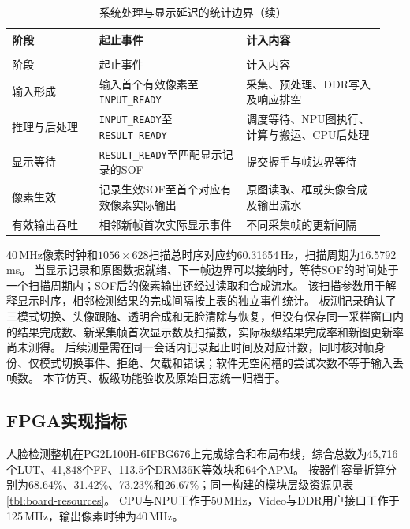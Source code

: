 \begin{reporttable}
\begin{longtable}{@{}p{0.22\linewidth}>{\raggedright\arraybackslash}p{0.37\linewidth}p{0.35\linewidth}@{}}
\caption{系统处理与显示延迟的统计边界}\label{tbl:system-latency-boundaries}\\
\toprule
阶段 & 起止事件 & 计入内容 \\
\midrule
\endfirsthead
\caption[]{系统处理与显示延迟的统计边界（续）}\\
\toprule
阶段 & 起止事件 & 计入内容 \\
\midrule
\endhead
\bottomrule
\endfoot
输入形成 & 输入首个有效像素至\texttt{INPUT\_READY} & 采集、预处理、DDR写入及响应排空 \\
推理与后处理 & \texttt{INPUT\_READY}至\texttt{RESULT\_READY} & 调度等待、NPU图执行、计算与搬运、CPU后处理 \\
显示等待 & \texttt{RESULT\_READY}至匹配显示记录的SOF & 提交握手与帧边界等待 \\
像素生效 & 记录生效SOF至首个对应有效像素实际输出 & 原图读取、框或头像合成及输出流水 \\
有效输出吞吐 & 相邻新帧首次实际显示事件 & 不同采集帧的更新间隔 \\
\end{longtable}
\end{reporttable}

40\,MHz像素时钟和$1056\times628$扫描总时序对应约60.31654\,Hz，扫描周期为16.5792\,ms。
当显示记录和原图数据就绪、下一帧边界可以接纳时，等待SOF的时间处于一个扫描周期内；SOF后的像素输出还经过读取和合成流水。
该扫描参数用于解释显示时序，相邻检测结果的完成间隔按上表的独立事件统计。
板测记录确认了三模式切换、头像跟随、透明合成和无脸清除与恢复，但没有保存同一采样窗口内的结果完成数、新采集帧首次显示数及扫描数，实际板级结果完成率和新图更新率尚未测得。
后续测量需在同一会话内记录起止时间及对应计数，同时核对帧身份、仅模式切换事件、拒绝、欠载和错误；软件无空闲槽的尝试次数不等于输入丢帧数。
本节仿真、板级功能验收及原始日志统一归档于。

\subsection{FPGA实现指标}

人脸检测整机在PG2L100H-6IFBG676上完成综合和布局布线，综合总数为45,716个LUT、41,848个FF、113.5个DRM36K等效块和64个APM。
按器件容量折算分别为68.64\%、31.42\%、73.23\%和26.67\%；同一构建的模块层级资源见表\ref{tbl:board-resources}。
CPU与NPU工作于50\,MHz，Video与DDR用户接口工作于125\,MHz，输出像素时钟为40\,MHz。

